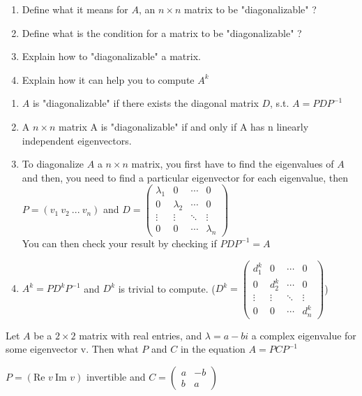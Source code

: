 \documentclass[12pt]{article}
\newcommand*{\xfield}[1]{\begin{mdframed}\centering #1\end{mdframed}\bigskip}
\newenvironment{note}{}{}
\begin{document}
\begin{note}
	\xfield{\begin{enumerate}
	\item Define what it means for $A$, an $n\times n$ matrix to be "diagonalizable" ?
	\item Define what is the condition for a matrix to be "diagonalizable" ?
	\item Explain how to "diagonalizable" a matrix.
	\item Explain how it can help you to compute $A^k$
	\end{enumerate} }
	\xfield{\begin{enumerate}
	\item $A$ is "diagonalizable" if there exists the diagonal matrix $D$, s.t. $A=PDP^{-1}$\\
	\item A $n \times n$ matrix A is "diagonalizable" if and only if A has n linearly independent eigenvectors.
	\item To diagonalize $A$ a $n \times n$ matrix, you first have to find the eigenvalues of $A$ and then, you need to find a particular eigenvector for each eigenvalue, then $P=(v_1\ v_2\ ...\ v_n)$ and $D = \begin{pmatrix}
	\lambda_1 & 0 & \cdots & 0\\
	0 & \lambda_2 & \cdots & 0\\
	\vdots&\vdots&\ddots&\vdots\\
	0&0&\cdots&\lambda_n
	\end{pmatrix}$\\
	You can then check your result by checking if $PDP^{-1} = A$
	\item $A^k = P D^k P^{-1}$ and $D^k$ is trivial to compute. ($D^k = \begin{pmatrix}
	d_1^k & 0 & \cdots & 0\\
	0 & d_2^k& \cdots & 0\\
	\vdots&\vdots&\ddots&\vdots\\
	0&0&\cdots&d_n^k
	\end{pmatrix}$)
	\end{enumerate} }
\end{note}

\begin{note}
	\xfield{Let $A$ be a $2\times 2$ matrix with real entries, and $\lambda = a-bi$ a complex eigenvalue for some eigenvector v. Then what $P$ and $C$ in the equation $A=PCP^{-1}$}
	\xfield{$P = (\text{Re } v\ \text{Im } v)$ invertible and $C=\begin{pmatrix}
	a&-b\\
	b&a
	\end{pmatrix}$ }
\end{note}
\end{document}

